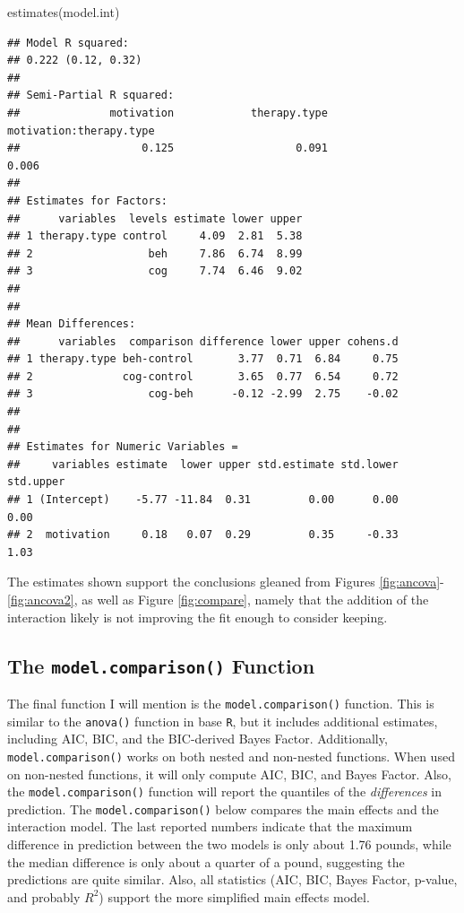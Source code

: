 \documentclass[
  english,
  man]{apa6}
\newenvironment{Shaded}{\begin{snugshade}}{\end{snugshade}}
\newcommand{\FunctionTok}[1]{\textcolor[rgb]{0.00,0.00,0.00}{#1}}
\newcommand{\NormalTok}[1]{#1}
\begin{document}
\small

\begin{Shaded}
\begin{Highlighting}[]
\FunctionTok{estimates}\NormalTok{(model.int)}
\end{Highlighting}
\end{Shaded}

\begin{verbatim}
## Model R squared:
## 0.222 (0.12, 0.32)
## 
## Semi-Partial R squared:
##              motivation            therapy.type motivation:therapy.type 
##                   0.125                   0.091                   0.006 
## 
## Estimates for Factors:
##      variables  levels estimate lower upper
## 1 therapy.type control     4.09  2.81  5.38
## 2                  beh     7.86  6.74  8.99
## 3                  cog     7.74  6.46  9.02
## 
## 
## Mean Differences:
##      variables  comparison difference lower upper cohens.d
## 1 therapy.type beh-control       3.77  0.71  6.84     0.75
## 2              cog-control       3.65  0.77  6.54     0.72
## 3                  cog-beh      -0.12 -2.99  2.75    -0.02
## 
## 
## Estimates for Numeric Variables = 
##     variables estimate  lower upper std.estimate std.lower std.upper
## 1 (Intercept)    -5.77 -11.84  0.31         0.00      0.00      0.00
## 2  motivation     0.18   0.07  0.29         0.35     -0.33      1.03
\end{verbatim}

\normalsize
The estimates shown support the conclusions gleaned from Figures \ref{fig:ancova}-\ref{fig:ancova2}, as well as Figure \ref{fig:compare}, namely that the addition of the interaction likely is not improving the fit enough to consider keeping.

\hypertarget{the-model.comparison-function}{%
\subsection{\texorpdfstring{The \texttt{model.comparison()} Function}{The model.comparison() Function}}\label{the-model.comparison-function}}

The final function I will mention is the \texttt{model.comparison()} function. This is similar to the \texttt{anova()} function in base \texttt{R}, but it includes additional estimates, including AIC, BIC, and the BIC-derived Bayes Factor. Additionally, \texttt{model.comparison()} works on both nested and non-nested functions. When used on non-nested functions, it will only compute AIC, BIC, and Bayes Factor. Also, the \texttt{model.comparison()} function will report the quantiles of the \emph{differences} in prediction. The \texttt{model.comparison()} below compares the main effects and the interaction model. The last reported numbers indicate that the maximum difference in prediction between the two models is only about 1.76 pounds, while the median difference is only about a quarter of a pound, suggesting the predictions are quite similar. Also, all statistics (AIC, BIC, Bayes Factor, p-value, and probably \(R^2\)) support the more simplified main effects model.
\end{document}
